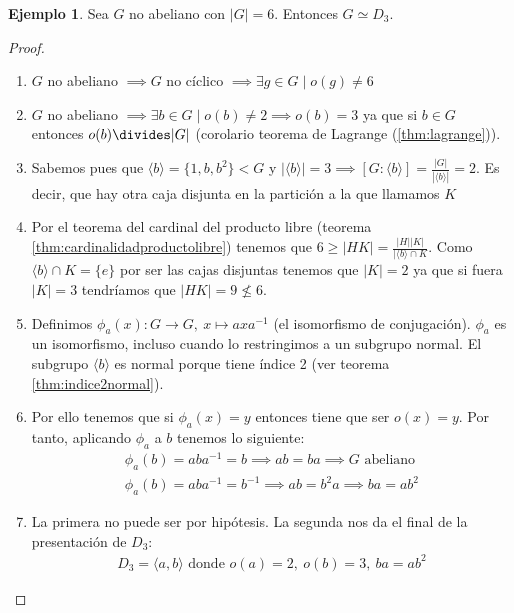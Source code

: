 \documentclass{book}
\theoremstyle{definition}
\newtheorem{ej}{Ejemplo}
\theoremstyle{remark}
\newcommand{\inv}[1]{#1^{-1}}
\newcommand{\isom}{\simeq}
\begin{document}
\begin{ej}
	\label{ej:orden6noabisomd3}
	Sea $G$ no abeliano con $|G| = 6$. Entonces $G \isom D_3$.
\end{ej}

\begin{proof}
	\begin{enumerate}
		\item $G$ no abeliano $\implies G$ no cíclico $\implies \exists g \in G \mid o(g) \neq 6$
		\item $G$ no abeliano $\implies \exists b \in G \mid o(b) \neq 2 \implies o(b) = 3$ ya que si $b \in G$ entonces $o(b) \divides |G|$ (corolario teorema de Lagrange (\ref{thm:lagrange})).
		\item Sabemos pues que $\langle b \rangle = \{1, b, b^2\} < G$ y $|\langle b \rangle| = 3 \implies [G:\langle b \rangle] = \frac{|G|}{|\langle b \rangle|} = 2$. Es decir, que hay otra caja disjunta en la partición a la que llamamos $K$
		\item Por el teorema del cardinal del producto libre (teorema \ref{thm:cardinalidadproductolibre}) tenemos que $6 \geq |HK| = \frac{|H||K|}{|\langle b \rangle \cap K}$. Como $\langle b \rangle \cap K = \{e\}$ por ser las cajas disjuntas tenemos que $|K| = 2$ ya que si fuera $|K| = 3$ tendríamos que $|HK| = 9 \not \leq 6$.
		\item Definimos $\phi_a(x) : G \to G,\ x \mapsto ax\inv{a}$ (el isomorfismo de conjugación). $\phi_a$ es un isomorfismo, incluso cuando lo restringimos a un subgrupo normal. El subgrupo $\langle b \rangle$ es normal porque tiene índice 2 (ver teorema \ref{thm:indice2normal}).
		\item Por ello tenemos que si $\phi_a(x) = y$ entonces tiene que ser $o(x) = y$. Por tanto, aplicando $\phi_a$ a $b$ tenemos lo siguiente:
		\begin{align*}
			\phi_a(b) = ab\inv{a} = b \implies ab = ba \implies G \text{ abeliano} \\
			\phi_a(b) = ab\inv{a} = \inv{b} \implies ab = b^2a \implies ba = ab^2
		\end{align*}
		\item La primera no puede ser por hipótesis. La segunda nos da el final de la presentación de $D_3$:
		\begin{align*}
			D_3 = \langle a, b \rangle \text{ donde } o(a) = 2,\ o(b) = 3,\ ba = ab^2
		\end{align*}
	\end{enumerate}
\end{proof}
\end{document}
